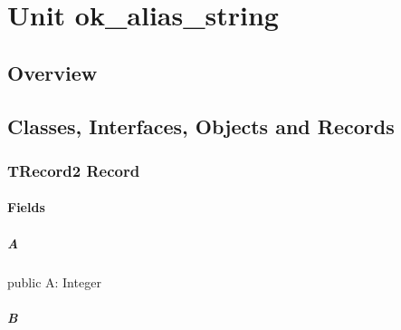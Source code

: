 \documentclass{report}
\begin{document}
\newlength{\tmplength}
\chapter{Unit ok{\_}alias{\_}string}
\section{Overview}
\begin{description}
\item[\texttt{\begin{ttfamily}TRecord2\end{ttfamily} Record}]
\end{description}
\section{Classes, Interfaces, Objects and Records}
\subsection*{TRecord2 Record}
\subsubsection*{\large{\textbf{Fields}}\normalsize\hspace{1ex}\hfill}
\paragraph*{A}\hspace*{\fill}

\begin{list}{}{
\setlength{\itemindent}{0cm}
\setlength{\listparindent}{0cm}
\setlength{\leftmargin}{\evensidemargin}
\addtolength{\leftmargin}{\tmplength}
\settowidth{\labelsep}{X}
\addtolength{\leftmargin}{\labelsep}
\setlength{\labelwidth}{\tmplength}
}
\begin{flushleft}
\item[\textbf{Declaration}\hfill]
\begin{ttfamily}
public A: Integer \end{ttfamily}


\end{flushleft}
\end{list}
\paragraph*{B}\hspace*{\fill}
\end{document}
